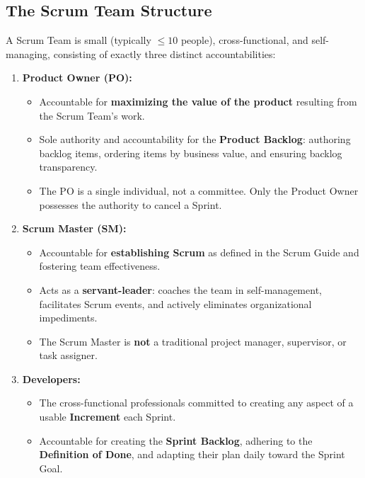 \subsection{The Scrum Team Structure}
A Scrum Team is small (typically $\le 10$ people), cross-functional, and self-managing, consisting of exactly three distinct accountabilities:
\begin{enumerate}
    \item \textbf{Product Owner (PO):}
    \begin{itemize}
        \item Accountable for \textbf{maximizing the value of the product} resulting from the Scrum Team's work.
        \item Sole authority and accountability for the \textbf{Product Backlog}: authoring backlog items, ordering items by business value, and ensuring backlog transparency.
        \item The PO is a single individual, not a committee. Only the Product Owner possesses the authority to cancel a Sprint.
    \end{itemize}
    \item \textbf{Scrum Master (SM):}
    \begin{itemize}
        \item Accountable for \textbf{establishing Scrum} as defined in the Scrum Guide and fostering team effectiveness.
        \item Acts as a \textbf{servant-leader}: coaches the team in self-management, facilitates Scrum events, and actively eliminates organizational impediments.
        \item The Scrum Master is \textbf{not} a traditional project manager, supervisor, or task assigner.
    \end{itemize}
    \item \textbf{Developers:}
    \begin{itemize}
        \item The cross-functional professionals committed to creating any aspect of a usable \textbf{Increment} each Sprint.
        \item Accountable for creating the \textbf{Sprint Backlog}, adhering to the \textbf{Definition of Done}, and adapting their plan daily toward the Sprint Goal.
    \end{itemize}
\end{enumerate}

